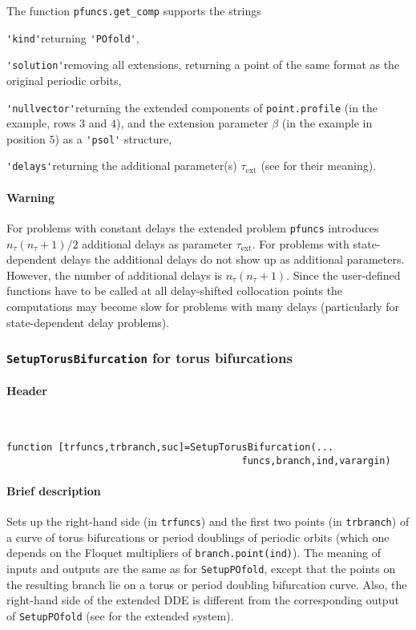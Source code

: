 \documentclass[11pt]{scrartcl}
\newcommand{\mt}[1]{\mathrm{#1}}
\newcommand{\mlvar}[1]{\lstinline[keywordstyle=\color{var}]!#1!}
\newcommand{\blist}[1]{\mbox{\lstinline!#1!}}
\begin{document}
The function \blist{pfuncs.get_comp} supports the strings
\begin{compactitem}
\item  \blist{'kind'}\quad returning \blist{'POfold'},
\item \blist{'solution'}\quad removing all extensions, returning a
  point of the same format as the original periodic orbits,
\item \blist{'nullvector'}\quad returning the extended components of
  \blist{point.profile} (in the example, rows $3$ and $4$), and the
  extension parameter $\beta$ (in the example in position $5$) as a
  \blist{'psol'} structure,
\item \blist{'delays'}\quad returning the additional parameter(s)
  $\tau_\mathrm{ext}$ (see \cite{S13} for their meaning).
\end{compactitem}
\paragraph{Warning}
For problems with constant delays the extended problem \mlvar{pfuncs}
introduces $n_\tau(n_\tau+1)/2$ additional delays as parameter
$\tau_\mt{ext}$. For problems with state-dependent delays the
additional delays do not show up as additional parameters. However,
the number of additional delays is $n_\tau(n_\tau+1)$. Since the
user-defined functions have to be called at all delay-shifted
collocation points the computations may become slow for problems with
many delays (particularly for state-dependent delay problems).

\subsubsection{\blist{SetupTorusBifurcation} for torus bifurcations}
\label{sec:torusbif}

\paragraph{Header}\
\begin{lstlisting}
function [trfuncs,trbranch,suc]=SetupTorusBifurcation(...
                                         funcs,branch,ind,varargin)
\end{lstlisting}

\paragraph{Brief description}
Sets up the right-hand side (in \blist{trfuncs}) and the first two
points (in \blist{trbranch}) of a curve of torus bifurcations or
period doublings of periodic orbits (which one depends on the Floquet
multipliers of \blist{branch.point(ind)}). The meaning of inputs and
outputs are the same as for \blist{SetupPOfold}, except that the
points on the resulting branch lie on a torus or period doubling
bifurcation curve. Also, the right-hand side of the extended DDE is
different from the corresponding output of \blist{SetupPOfold} (see
\cite{S13} for the extended system).
\end{document}
